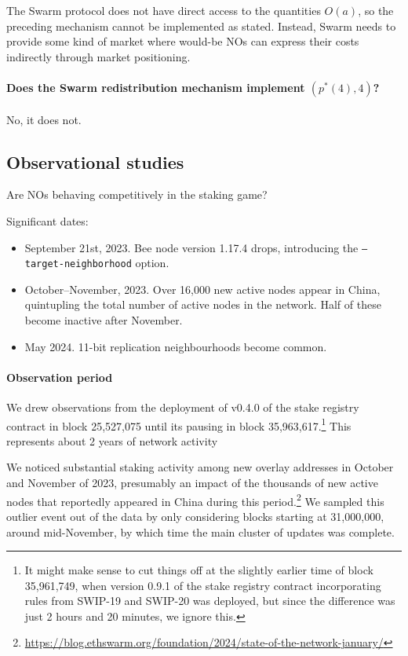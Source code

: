 The Swarm protocol does not have direct access to the quantities $O(a)$, so the preceding mechanism cannot be implemented as stated.
%
Instead, Swarm needs to provide some kind of market where would-be NOs can express their costs indirectly through market positioning.

\paragraph{Does the Swarm redistribution mechanism implement $(p^*(4),4)$?}

No, it does not.

\newpage
\subsection*{Observational studies}

Are NOs behaving competitively in the staking game?
%

Significant dates:
\begin{itemize}
  \item September 21st, 2023. Bee node version 1.17.4 drops, introducing the \texttt{--target-neighborhood} option.
  \item October--November, 2023. Over 16,000 new active nodes appear in China, quintupling the total number of active nodes in the network. Half of these become inactive after November.
  \item May 2024. 11-bit replication neighbourhoods become common.
\end{itemize}

\paragraph{Observation period}
We drew observations from the deployment of v0.4.0 of the stake registry contract in block 25,527,075 until its pausing in block 35,963,617.\footnote{It might make sense to cut things off at the slightly earlier time of block 35,961,749, when version 0.9.1 of the stake registry contract incorporating rules from SWIP-19 and SWIP-20 was deployed, but since the difference was just 2 hours and 20 minutes, we ignore this.} This represents about 2 years of network activity

We noticed substantial staking activity among new overlay addresses in October and November of 2023, presumably an impact of the thousands of new active nodes that reportedly appeared in China during this period.\footnote{\url{https://blog.ethswarm.org/foundation/2024/state-of-the-network-january/}}
%
We sampled this outlier event out of the data by only considering blocks starting at 31,000,000, around mid-November, by which time the main cluster of updates was complete.


